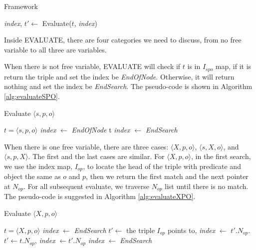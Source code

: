 \documentclass{article}
\begin{document}
\begin{enumerate}
\begin{enumerate}
\begin{algorithm}[H]
\caption{Framework}\label{alg:evaluate}
\begin{algorithmic}

\State \textit{index}, $t' \leftarrow$ Evaluate($t$, \textit{index})
\EndWhile

\end{algorithmic}
\end{algorithm}

Inside EVALUATE, there are four categories we need to discuss, from no free variable to all three are variables. 

When there is not free variable, EVALUATE will check if $t$ is in $I_{spo}$ map, if it is return the triple and set the index be \textit{EndOfNode}. Otherwise, it will return nothing and set the index be \textit{EndSearch}. The pseudo-code is shown in Algorithm \eqref{alg:evaluateSPO}. 

\begin{algorithm}[H]
\caption{Evaluate $\langle s, p, o\rangle$}\label{alg:evaluateSPO}
\begin{algorithmic}
\Require $t = \langle s, p, o\rangle$
\State \textit{index} $\leftarrow$ \textit{EndOfNode}
\State \Return t
\Else
\State \textit{index} $\leftarrow$ \textit{EndSearch} 
\EndIf
\end{algorithmic}
\end{algorithm}

When there is one free variable, there are three cases: $\langle X, p, o\rangle$, $\langle s, X, o\rangle$, and $\langle s, p, X\rangle$. The first and the last cases are similar. For $\langle X, p, o\rangle$, in the first search, we use the index map, $I_{op}$, to locate the head of the triple with predicate and object the same as $o$ and $p$, then we return the first match and the next pointer at $N_{op}$. For all subsequent evaluate, we traverse $N_{op}$ list until there is no match. The pseudo-code is suggested in Algorithm \eqref{alg:evaluateXPO}.
 
\begin{algorithm}[H]
\caption{Evaluate $\langle X, p, o\rangle$}\label{alg:evaluateXPO}
\begin{algorithmic}
\Require $t = \langle X, p, o\rangle$
\State \textit{index} $\leftarrow$ \textit{EndSearch}
\EndIf
{} 
\State $t'\leftarrow$ the triple $I_{op}$ points to, \textit{index} $\leftarrow$ $t'.N_{op}$.
\Else{}
\State $t'\leftarrow t.N_{op}$, \textit{index} $\leftarrow t'.N_{op}$
\EndIf
{}
\State \textit{index} $\leftarrow$ \textit{EndSearch}
\EndIf
\end{algorithmic}
\end{algorithm}


\end{enumerate}
\end{enumerate}
\end{document}
